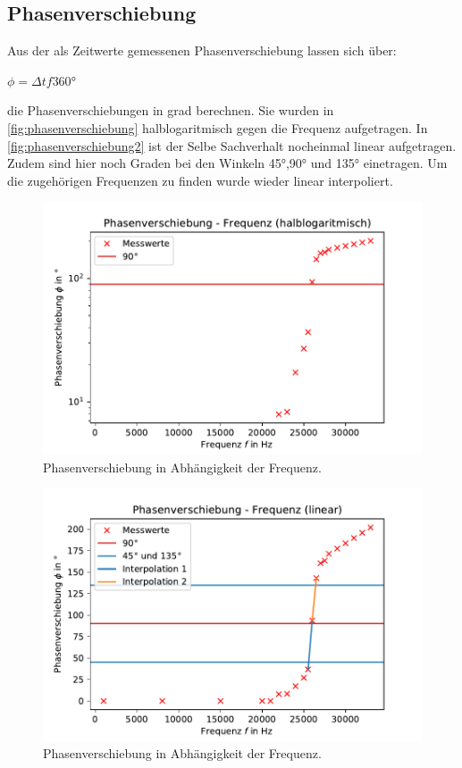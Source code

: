 \subsection{Phasenverschiebung}
\label{sec:phs}
Aus der als Zeitwerte gemessenen Phasenverschiebung lassen sich über:
\begin{center}
    $\phi=\Delta tf360°$\\
\end{center}
die Phasenverschiebungen in grad berechnen. Sie wurden in \autoref{fig:phasenverschiebung} halblogaritmisch gegen die Frequenz
aufgetragen. In \autoref{fig:phasenverschiebung2} ist der Selbe Sachverhalt nocheinmal linear aufgetragen. Zudem
sind hier noch Graden bei den Winkeln 45°,90° und 135° einetragen. Um die zugehörigen Frequenzen zu finden wurde
wieder linear interpoliert.
\begin{figure}
    \centering
    \includegraphics{phasenverschiebung.pdf}
    \caption{Phasenverschiebung in Abhängigkeit der Frequenz.}
    \label{fig:phasenverschiebung}
  \end{figure}
  \begin{figure}
    \centering
    \includegraphics{phasenverschiebunglin.pdf}
    \caption{Phasenverschiebung in Abhängigkeit der Frequenz.}
    \label{fig:phasenverschiebung2}
  \end{figure}
